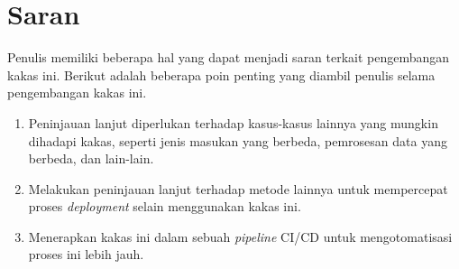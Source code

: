 \section{Saran}

Penulis memiliki beberapa hal yang dapat menjadi saran terkait pengembangan kakas ini.
Berikut adalah beberapa poin penting yang diambil penulis selama pengembangan kakas ini.

\begin{enumerate}
    \item Peninjauan lanjut diperlukan terhadap kasus-kasus lainnya yang mungkin dihadapi kakas, seperti jenis masukan yang berbeda, pemrosesan data yang berbeda, dan lain-lain.
    \item Melakukan peninjauan lanjut terhadap metode lainnya untuk mempercepat proses \textit{deployment} selain menggunakan kakas ini.
    \item Menerapkan kakas ini dalam sebuah \textit{pipeline} CI/CD untuk mengotomatisasi proses ini lebih jauh.
\end{enumerate}